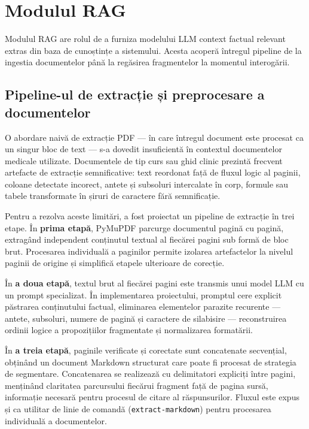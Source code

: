 \documentclass[12pt, a4paper, oneside, romanian]{teza-upb}
\begin{document}
\section{Modulul RAG}

Modulul RAG are rolul de a furniza modelului LLM context factual relevant extras din baza de cunoștințe a sistemului. Acesta acoperă întregul pipeline de la ingestia documentelor până la regăsirea fragmentelor la momentul interogării.

\subsection{Pipeline-ul de extracție și preprocesare a documentelor}

O abordare naivă de extracție PDF — în care întregul document este procesat ca un singur bloc de text — s-a dovedit insuficientă în contextul documentelor medicale utilizate. Documentele de tip curs sau ghid clinic prezintă frecvent artefacte de extracție semnificative: text reordonat față de fluxul logic al paginii, coloane detectate incorect, antete și subsoluri intercalate în corp, formule sau tabele transformate în șiruri de caractere fără semnificație.

Pentru a rezolva aceste limitări, a fost proiectat un pipeline de extracție în trei etape. În \textbf{prima etapă}, PyMuPDF parcurge documentul pagină cu pagină, extragând independent conținutul textual al fiecărei pagini sub formă de bloc brut. Procesarea individuală a paginilor permite izolarea artefactelor la nivelul paginii de origine și simplifică etapele ulterioare de corecție.

În \textbf{a doua etapă}, textul brut al fiecărei pagini este transmis unui model LLM cu un prompt specializat. În implementarea proiectului, promptul cere explicit păstrarea conținutului factual, eliminarea elementelor parazite recurente — antete, subsoluri, numere de pagină și caractere de silabisire — reconstruirea ordinii logice a propozițiilor fragmentate și normalizarea formatării.

În \textbf{a treia etapă}, paginile verificate și corectate sunt concatenate secvențial, obținând un document Markdown structurat care poate fi procesat de strategia de segmentare. Concatenarea se realizează cu delimitatori expliciți între pagini, menținând claritatea parcursului fiecărui fragment față de pagina sursă, informație necesară pentru procesul de citare al răspunsurilor. Fluxul este expus și ca utilitar de linie de comandă (\texttt{extract-markdown}) pentru procesarea individuală a documentelor.
\end{document}
